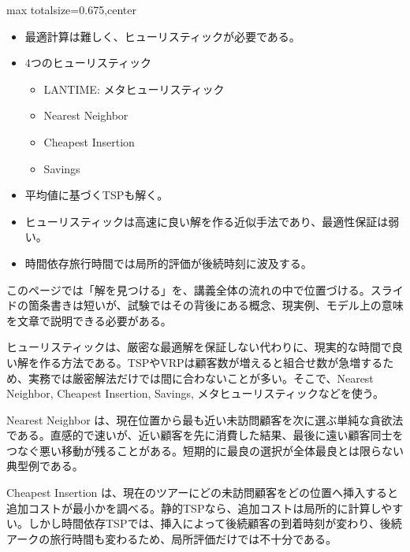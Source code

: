 \clearpage
{}
\begin{adjustbox}{max totalsize={\textwidth}{0.675\textheight},center}
\begin{minipage}{\textwidth}\scriptsize
\begin{minipage}[t]{0.485\textwidth}
\begin{itemize}
\item 最適計算は難しく、ヒューリスティックが必要である。
\item 4つのヒューリスティック
\begin{itemize}
\item LANTIME: メタヒューリスティック
\item Nearest Neighbor
\item Cheapest Insertion
\item Savings
\end{itemize}
\item 平均値に基づくTSPも解く。
\end{itemize}
\begin{itemize}
\item ヒューリスティックは高速に良い解を作る近似手法であり、最適性保証は弱い。
\item 時間依存旅行時間では局所的評価が後続時刻に波及する。
\end{itemize}
\end{minipage}\hfill
\begin{minipage}[t]{0.485\textwidth}
このページでは「解を見つける」を、講義全体の流れの中で位置づける。スライドの箇条書きは短いが、試験ではその背後にある概念、現実例、モデル上の意味を文章で説明できる必要がある。\par
ヒューリスティックは、厳密な最適解を保証しない代わりに、現実的な時間で良い解を作る方法である。TSPやVRPは顧客数が増えると組合せ数が急増するため、実務では厳密解法だけでは間に合わないことが多い。そこで、Nearest Neighbor, Cheapest Insertion, Savings, メタヒューリスティックなどを使う。\par
Nearest Neighbor は、現在位置から最も近い未訪問顧客を次に選ぶ単純な貪欲法である。直感的で速いが、近い顧客を先に消費した結果、最後に遠い顧客同士をつなぐ悪い移動が残ることがある。短期的に最良の選択が全体最良とは限らない典型例である。\par
Cheapest Insertion は、現在のツアーにどの未訪問顧客をどの位置へ挿入すると追加コストが最小かを調べる。静的TSPなら、追加コストは局所的に計算しやすい。しかし時間依存TSPでは、挿入によって後続顧客の到着時刻が変わり、後続アークの旅行時間も変わるため、局所評価だけでは不十分である。\par

\end{minipage}
\end{minipage}
\end{adjustbox}
